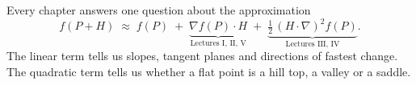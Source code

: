 \begin{keyidea}
Every chapter answers one question about the approximation
\[
 f(P+H)\;\approx\; f(P) \;+\; \underbrace{\nabla f(P)\cdot H}_{\text{Lectures I, II, V}}
 \;+\; \underbrace{\tfrac12\,(H\cdot\nabla)^2 f(P)}_{\text{Lectures III, IV}} .
\]
The linear term tells us slopes, tangent planes and directions of fastest change. The
quadratic term tells us whether a flat point is a hill top, a valley or a saddle.
\end{keyidea}

